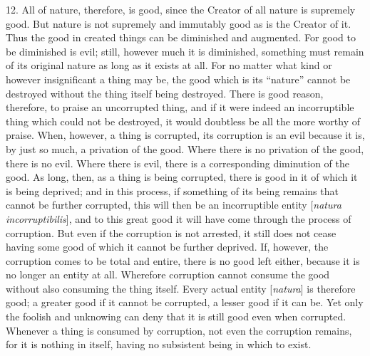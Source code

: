 12. All of nature, therefore, is good, since the Creator of all nature is supremely good. But nature is not supremely and immutably good as is the Creator of it. Thus the good in created things can be diminished and augmented. For good to be diminished is evil; still, however much it is diminished, something must remain of its original nature as long as it exists at all. For no matter what kind or however insignificant a thing may be, the good which is its ``nature'' cannot be destroyed without the thing itself being destroyed. There is good reason, therefore, to praise an uncorrupted thing, and if it were indeed an incorruptible thing which could not be destroyed, it would doubtless be all the more worthy of praise. When, however, a thing is corrupted, its corruption is an evil because it is, by just so much, a privation of the good. Where there is no privation of the good, there is no evil. Where there is evil, there is a corresponding diminution of the good. As long, then, as a thing is being corrupted, there is good in it of which it is being deprived; and in this process, if something of its being remains that cannot be further corrupted, this will then be an incorruptible entity [\emph{natura incorruptibilis}], and to this great good it will have come through the process of corruption. But even if the corruption is not arrested, it still does not cease having some good of which it cannot be further deprived. If, however, the corruption comes to be total and entire, there is no good left either, because it is no longer an entity at all. Wherefore corruption cannot consume the good without also consuming the thing itself. Every actual entity [\emph{natura}] is therefore good; a greater good if it cannot be corrupted, a lesser good if it can be. Yet only the foolish and unknowing can deny that it is still good even when corrupted. Whenever a thing is consumed by corruption, not even the corruption remains, for it is nothing in itself, having no subsistent being in which to exist.

